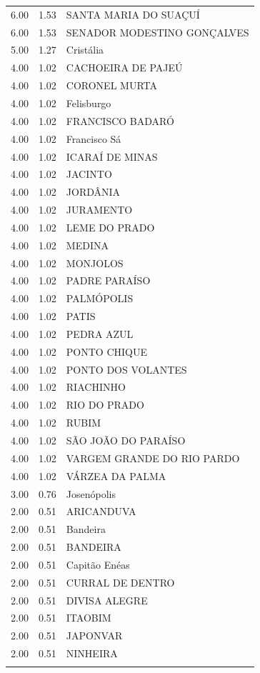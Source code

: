 \documentclass[a4paper, 12pt, openright, oneside, english, brazil, article]{abntex2}
\begin{document}
\begin{scriptsize}
\begin{longtable}{rrl}
			6.00 & 1.53 & SANTA MARIA DO SUAÇUÍ \\ 
			6.00 & 1.53 & SENADOR MODESTINO GONÇALVES \\ 
			5.00 & 1.27 & Cristália \\ 
			4.00 & 1.02 & CACHOEIRA DE PAJEÚ \\ 
			4.00 & 1.02 & CORONEL MURTA \\ 
			4.00 & 1.02 & Felisburgo \\ 
			4.00 & 1.02 & FRANCISCO BADARÓ \\ 
			4.00 & 1.02 & Francisco Sá \\ 
			4.00 & 1.02 & ICARAÍ DE MINAS \\ 
			4.00 & 1.02 & JACINTO \\ 
			4.00 & 1.02 & JORDÂNIA \\ 
			4.00 & 1.02 & JURAMENTO \\ 
			4.00 & 1.02 & LEME DO PRADO \\ 
			4.00 & 1.02 & MEDINA \\ 
			4.00 & 1.02 & MONJOLOS \\ 
			4.00 & 1.02 & PADRE PARAÍSO \\ 
			4.00 & 1.02 & PALMÓPOLIS \\ 
			4.00 & 1.02 & PATIS \\ 
			4.00 & 1.02 & PEDRA AZUL \\ 
			4.00 & 1.02 & PONTO CHIQUE \\ 
			4.00 & 1.02 & PONTO DOS VOLANTES \\ 
			4.00 & 1.02 & RIACHINHO \\ 
			4.00 & 1.02 & RIO DO PRADO \\ 
			4.00 & 1.02 & RUBIM \\ 
			4.00 & 1.02 & SÃO JOÃO DO PARAÍSO \\ 
			4.00 & 1.02 & VARGEM GRANDE DO RIO PARDO \\ 
			4.00 & 1.02 & VÁRZEA DA PALMA \\ 
			3.00 & 0.76 & Josenópolis \\ 
			2.00 & 0.51 & ARICANDUVA \\ 
			2.00 & 0.51 & Bandeira \\ 
			2.00 & 0.51 & BANDEIRA \\ 
			2.00 & 0.51 & Capitão Enéas \\ 
			2.00 & 0.51 & CURRAL DE DENTRO \\ 
			2.00 & 0.51 & DIVISA ALEGRE \\ 
			2.00 & 0.51 & ITAOBIM \\ 
			2.00 & 0.51 & JAPONVAR \\ 
			2.00 & 0.51 & NINHEIRA \\ 
			\hline
			\hline
			\label{motivo4}
		\end{longtable}
	\end{scriptsize}
\end{document}
